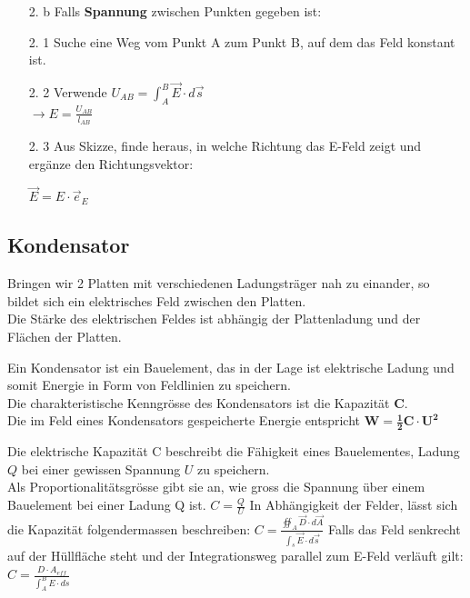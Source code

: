 \iend
\begin{itemize}
	\item [2. b] Falls \textbf{Spannung} zwischen Punkten gegeben ist:\\

	\end{itemize}
	\beginip
	\begin{itemize}

	\item [2. 1]  Suche eine Weg vom Punkt A zum Punkt B, auf dem das Feld konstant ist. \\

	\item [2. 2] Verwende $\displaystyle U_{AB} = \int_A^B \vec{E}\cdot d\vec{s}$ \\
	$\displaystyle \rightarrow E = \frac{U_{AB}}{l_{AB}}$

	\item [2. 3] Aus Skizze, finde heraus, in welche Richtung das E-Feld zeigt und ergänze den Richtungsvektor:
	\begin{center}
		$\vec{E} = E \cdot \vec{e}_E$
	\end{center}
	\end{itemize}
	\iend
\iend


\newpage
\subsection{Kondensator}

Bringen wir 2 Platten mit verschiedenen Ladungsträger nah zu einander, so bildet sich ein elektrisches Feld zwischen den Platten. \\
Die Stärke des elektrischen Feldes ist abhängig der Plattenladung und der Flächen der Platten.

\fix
\fix
\fix
{}
\beginip
Ein Kondensator ist ein Bauelement, das in der Lage ist elektrische Ladung und somit Energie in Form von Feldlinien zu speichern. \\
Die charakteristische Kenngrösse des Kondensators ist die Kapazität \textbf{C}. \\
Die im Feld eines Kondensators gespeicherte Energie entspricht $\mathbf{W = \frac{1}{2} C \cdot U^2}$ \\
\iend



\fix
\fix
\fix
{}
\beginip
Die elektrische Kapazität C beschreibt die Fähigkeit eines Bauelementes, Ladung $Q$ bei einer gewissen Spannung $U$ zu speichern. \\
Als Proportionalitätsgrösse gibt sie an, wie gross die Spannung über einem Bauelement bei einer Ladung Q ist.
\formulaBegin
$C =\displaystyle \frac{Q}{U}$
\formulaEnd
In Abhängigkeit der Felder, lässt sich die Kapazität folgendermassen beschreiben:
\formulaBegin
$ C = \displaystyle \frac{\oiint_A \vec{D} \cdot d \vec{A} }{ \int_s \vec{E} \cdot d\vec{s}}$
\formulaEnd
Falls das Feld senkrecht auf der Hüllfläche steht und der Integrationsweg parallel zum E-Feld verläuft gilt:
\formulaBegin
$ C= \displaystyle \frac{D \cdot A_{eff} } {\int_A^B E \cdot ds} $
\formulaEnd
\iend


